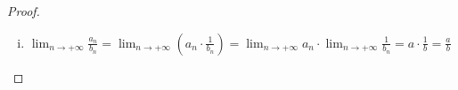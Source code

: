 \begin{proof}
\begin{enumerate}[i)]
\begin{proof}
      Για $ \varepsilon = \frac{\abs{b}}{2} >0 $ και λόγω 
      ότι $ \lim_{n \to +\infty} b_{n} = b $
      έχουμε ότι $ \exists n_{0} \in \mathbb{N} \; : \; 
      \forall n \geq n_{0} \quad \abs{b_{n}-b} 
      < \frac{\abs{b}}{2} $ 

      Άρα για $ n \geq n_{0} $, έχουμε 
      \begin{equation}\label{eq:idiot1/b}
        \abs{b} = \abs{b - b_{n} + b_{n}} \leq 
        \abs{b - b_{n}} + \abs{b_{n}} <
        \frac{\abs{b}}{2} + \abs{b_{n}} \Leftrightarrow 
        \abs{b_{n}} > \abs{b} -
        \frac{\abs{b}}{2} \Leftrightarrow \abs{b_{n}}  > 
        \frac{\abs{b}}{2} 
      \end{equation} 
      δηλαδή, $ b_{n} \neq 0, \; \forall n \geq n_{0} $.
      \qed 

      Οπότε, για $ n \geq n_{0} $ έχουμε ότι:

      \[ 
        \abs{\frac{1}{b_{n}} - \frac{1}{b}} = \abs{\frac{b-b_{n}}{b_{n}\cdot b}}
        = \frac{\abs{b-b_{n}} }{\abs{b_{n}} \cdot \abs{b}}
        \overset{\eqref{eq:idiot1/b}}{<} 
        \frac{2 \abs{b - b_{n}}}{\abs{b}^{2}} 
      \]

      Έστω $ \varepsilon >0 $, τότε επειδή 
      $ \lim_{n \to +\infty} b_{n} =b $, για 
      $ \frac{\varepsilon \abs{b} ^{2}}{2} > 0 $, έχουμε ότι
      \begin{equation}\label{eq:idiot1/b2}
        \exists n_{1} \in \mathbb{N} \; : \; \forall n 
        \geq n_{1} \quad \abs{b - b_{n}} <
        \frac{\varepsilon \abs{b}^{2}}{2}
      \end{equation} 

      Επιλέγουμε $ n_{2} = \max \{ n_{0}, n_{1} \} $. 
      Τότε $ \forall n \geq n_{2} $ ισχύει ότι 
      \[
        \abs{\frac{1}{b_{n}} - \frac{1}{b}} < 
        \frac{2 \abs{b -b_{n}}}{\abs{b} ^{2}} 
        \overset{\eqref{eq:idiot1/b2}}{<}  \varepsilon 
      \] 
    \end{proof}

  \item 
    $ \lim_{n \to +\infty} \frac{a_{n}}{b_{n}} = 
    \lim_{n \to +\infty} \left(a_{n}\cdot \frac{1}{b_{n}}
    \right) = \lim_{n \to +\infty} a_{n} \cdot \lim_{n \to +\infty} 
    \frac{1}{b_{n}} = a \cdot \frac{1}{b} = \frac{a}{b} $
\end{enumerate}
\end{proof}

